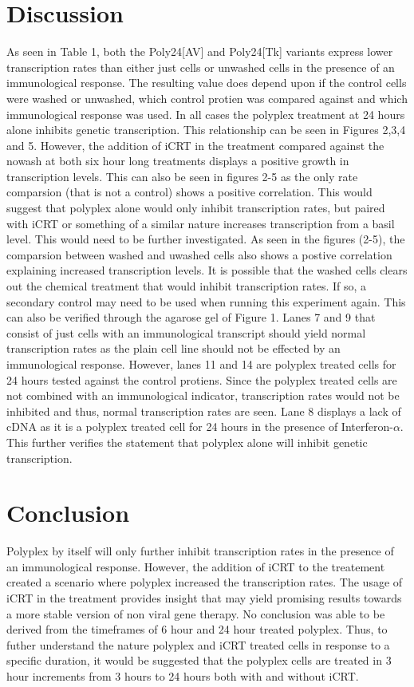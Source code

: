 \documentclass[journal, a4paper]{IEEEtran}
\begin{document}
\section{Discussion}
As seen in Table 1, both the Poly24[AV] and Poly24[Tk] variants express lower transcription rates
than either just cells or unwashed cells in the presence of an immunological response.
The resulting value does depend upon if the control cells were washed or unwashed, which control
protien was compared against and which immunological response was used. In all cases the
polyplex treatment at 24 hours alone inhibits genetic transcription.
This relationship can be seen in Figures 2,3,4 and 5. However,
the addition of iCRT in the treatment compared against the nowash at both six hour long treatments
displays a positive growth in transcription levels. This can also be seen in figures 2-5 as the
only rate comparsion (that is not a control) shows a positive correlation. This would suggest that polyplex alone
would only inhibit transcription rates, but paired with iCRT or something of a similar nature
increases transcription from a basil level. This would need to be further investigated.
As seen in the figures (2-5), the comparsion between washed and uwashed cells also shows a postive correlation
explaining increased transcription levels. It is possible that the washed cells
clears out the chemical treatment that would inhibit transcription rates. If so, a secondary
control may need to be used when running this experiment again.
This can also be verified through the agarose gel of Figure 1. Lanes 7 and 9
that consist of just cells with an immunological transcript should yield normal
transcription rates as the plain cell line should not be effected by an immunological response.
However, lanes 11 and 14 are polyplex treated cells for 24 hours tested against the control protiens.
Since the polyplex treated cells are not combined with an immunological indicator, transcription
rates would not be inhibited and thus, normal transcription rates are seen.
Lane 8 displays a lack of cDNA as it is a polyplex treated cell for 24 hours in the presence
of Interferon-$\alpha$. This further verifies the statement that polyplex alone will inhibit genetic transcription.

\section{Conclusion}

Polyplex by itself will only further inhibit transcription rates in the presence of an immunological response.
However, the addition of iCRT to the treatement created a scenario where polyplex increased the
transcription rates. The usage of iCRT in the treatment provides insight that may yield promising results towards
a more stable version of non viral gene therapy. No conclusion was able to be derived from the timeframes of 6 hour
and 24 hour treated polyplex. Thus, to futher understand the nature polyplex and iCRT treated cells in response to a specific duration,
it would be suggested that the polyplex cells are treated in 3 hour increments from 3 hours to 24 hours both with and without iCRT.
\end{document}
